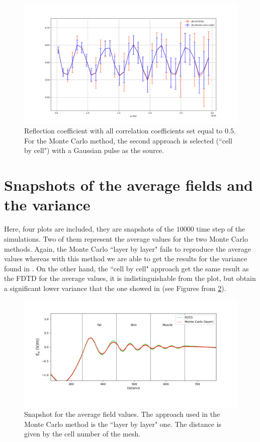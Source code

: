 \documentclass[12pt, oneside]{book}
\begin{document}
\begin{figure}
\centering
\includegraphics[scale=0.4]{Rsfdtdmcgausscellcorr05(8).png}
\caption{Reflection coefficient with all correlation coefficients set equal to $0.5$. For the Monte Carlo method, the second approach is selected (``cell by cell") with a Gaussian pulse as the source.}\label{stdRcorr05(8)}
\end{figure}

\section{Snapshots of the average fields and the variance}
Here, four plots are included, they are snapshots of the $10000$ time step of the simulations. Two of them represent the average values for the two Monte Carlo methods. Again, the Monte Carlo ``layer by layer" fails to reproduce the average values whereas with this method we are able to get the results for the variance found in \cite{smith2011stochastic,smith2012stochastic}. On the other hand, the ``cell by cell" approach get the same result as the FDTD for the average values, it is indistinguishable from the plot, but obtain a significant lower variance that the one showed in \cite{smith2012stochastic} (see Figures from \ref{Exlayer(12)}).

\begin{figure}
\centering
\includegraphics[scale=0.6]{Exlayer(12).png}
\caption{Snapshot for the average field values. The approach used in the Monte Carlo method is the ``layer by layer" one. The distance is given by the cell number of the mesh.}\label{Exlayer(12)}
\end{figure}
\end{document}
